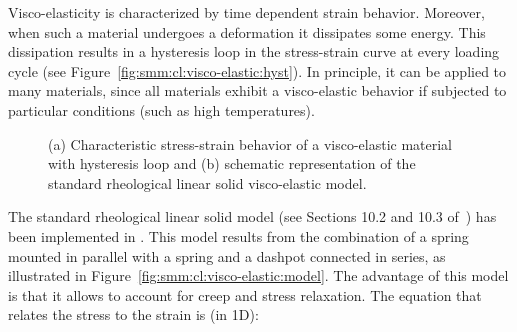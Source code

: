 Visco-elasticity is characterized by time dependent strain behavior. Moreover, when such a material undergoes a deformation it dissipates some energy. This dissipation results in a hysteresis loop in the stress-strain curve at every loading cycle (see Figure~\ref{fig:smm:cl:visco-elastic:hyst}). In principle, it can be applied to many materials, since all materials exhibit a visco-elastic behavior if subjected to particular conditions (such as high temperatures).
\begin{figure}[!htb]
  \begin{center}

    \hspace{0.05\textwidth}
    \caption{(a) Characteristic stress-strain behavior of a visco-elastic material with hysteresis loop and (b) schematic representation of the standard rheological linear solid visco-elastic model.}
    \label{fig:smm:cl:visco-elastic}
  \end{center}
\end{figure}
The standard rheological linear solid model (see Sections 10.2 and 10.3 of~\cite{simo92}) has been implemented in \akantu. This model results from the combination of a spring mounted in parallel with a spring and a dashpot connected in series, as illustrated in Figure~\ref{fig:smm:cl:visco-elastic:model}. The advantage of this model is that it allows to account for creep and stress relaxation. The equation that relates the stress to the strain is (in 1D):
